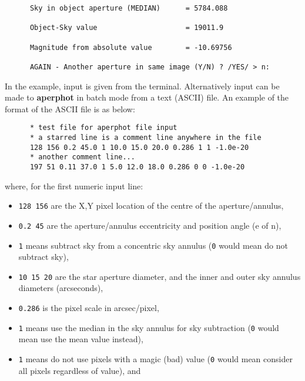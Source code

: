 \begin{description}
\begin{small}
\begin{verbatim}
      Sky in object aperture (MEDIAN)      = 5784.088

      Object-Sky value                     = 19011.9

      Magnitude from absolute value        = -10.69756

      AGAIN - Another aperture in same image (Y/N) ? /YES/ > n:
\end{verbatim}
\end{small}

In the example, input is given from the terminal.  Alternatively input
can be made to {\bf aperphot} in batch mode from a text (ASCII) file.  An
example of the format of the ASCII file is as below:

\begin{small}
\begin{verbatim}
      * test file for aperphot file input
      * a starred line is a comment line anywhere in the file
      128 156 0.2 45.0 1 10.0 15.0 20.0 0.286 1 1 -1.0e-20
      * another comment line...
      197 51 0.11 37.0 1 5.0 12.0 18.0 0.286 0 0 -1.0e-20
\end{verbatim}
\end{small}

where, for the first numeric input line:

\begin{itemize}

\item {\tt 128 156} are the X,Y pixel location of the centre of the
aperture/annulus,

\item {\tt 0.2 45} are the aperture/annulus eccentricity and position
angle (e of n),

\item {\tt 1} means subtract sky from a concentric sky annulus ({\tt 0}
would mean do not subtract sky),

\item {\tt 10 15 20} are the star aperture diameter, and the inner and
outer sky annulus diameters (arcseconds),

\item {\tt 0.286} is the pixel scale in arcsec/pixel,

\item {\tt 1} means use the median in the sky annulus for sky
subtraction ({\tt 0} would mean use the mean value instead),

\item {\tt 1} means do not use pixels with a magic (bad) value ({\tt 0}
would mean consider all pixels regardless of value), and


\end{itemize}
\end{description}
